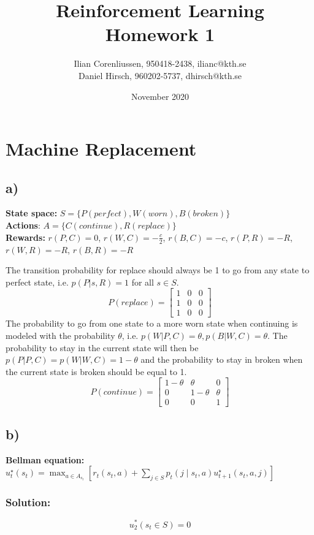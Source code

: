 \documentclass{article}
\title{Reinforcement Learning\\
       Homework 1}
\author{Ilian Corenliussen, 950418-2438, ilianc@kth.se\\ 
        Daniel Hirsch, 960202-5737, dhirsch@kth.se}
\date{November 2020}
\begin{document}
\maketitle

\section{Machine Replacement}
\subsection*{a)}
\textbf{State space:} $S = \{P(perfect), W(worn), B(broken)\} $\\
\textbf{Actions}: $A = \{ C (continue), R(replace) \}$\\
\textbf{Rewards:} $r(P,C) = 0$, $r(W,C) = -\frac{c}{2}$, $r(B,C) = -c$, $r(P, R) = -R$, $r(W, R) = -R$, $r(B, R) = -R$


The transition probability for replace should always be 1 to go from any state to perfect state, i.e. $p(P|s, R) = 1$ for all $s \in S$.  
\[
		P(replace) = \begin{bmatrix}
		        1 & 0 & 0 \\
		        1 & 0 & 0\\
		        1 & 0 & 0
		        \end{bmatrix}
\]
The probability to go from one state to a more worn state when continuing is modeled with the probability $\theta$, i.e. $p(W|P,C)=\theta, p(B|W,C)=\theta$. The probability to stay in the current state will then be $p(P|P,C)=p(W|W,C)=1-\theta$ and the probability to stay in broken when the current state is broken should be equal to 1.
\[
		P(continue) = \begin{bmatrix}
		        1-\theta & \theta & 0 \\
		        0 & 1-\theta & \theta\\
		        0 & 0 & 1
		        \end{bmatrix}
\]
\subsection*{b)}
\textbf{Bellman equation:} $u_{t}^{\star}\left(s_{t}\right)=\max _{a \in A_{s_{t}}}\left[r_{t}\left(s_{t}, a\right)+\sum_{j \in S} p_{t}\left(j \mid s_{t}, a\right) u_{t+1}^{\star}\left(s_{t}, a, j\right)\right]$

\subsubsection*{Solution:}
\begin{equation}
u_{2}^{*}(s_t \in S)  = 0
\end{equation}
\end{document}
